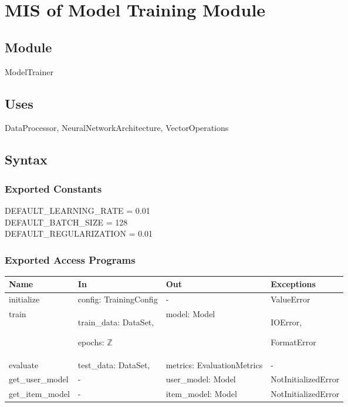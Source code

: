 \documentclass[12pt, titlepage]{article}
\begin{document}
\section{MIS of Model Training Module} \label{ModuleMT}

\subsection{Module}

ModelTrainer

\subsection{Uses}
DataProcessor, NeuralNetworkArchitecture, VectorOperations

\subsection{Syntax}

\subsubsection{Exported Constants}
DEFAULT\_LEARNING\_RATE = 0.01\\
DEFAULT\_BATCH\_SIZE = 128\\
DEFAULT\_REGULARIZATION = 0.01
\subsubsection{Exported Access Programs}

\begin{center}
\begin{tabular}{p{3cm} p{4cm} p{4cm} p{2cm}}
\hline
\textbf{Name} & \textbf{In} & \textbf{Out} & \textbf{Exceptions} \\
\hline
initialize & config: TrainingConfig & - & ValueError \\
\hline
train & train\_data: DataSet,

epochs: $\mathbb{Z}$

& model: Model & IOError,

FormatError \\
\hline
evaluate & test\_data: DataSet,

& metrics: EvaluationMetrics & - \\
\hline
get\_user\_model & 

- & user\_model: Model & NotInitializedError \\
\hline
get\_item\_model & 

- & item\_model: Model & NotInitializedError \\
\hline
\end{tabular}
\end{center}
\end{document}
